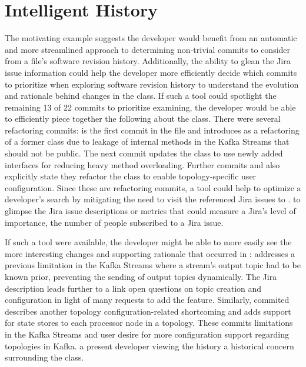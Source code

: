 
\section{Intelligent History}

The motivating example suggests the developer would benefit from an automatic 
and more streamlined approach to determining  non-trivial commits to consider from a file's software revision history.
Additionally, the ability to glean the Jira issue information could help the developer 
more efficiently decide which commits to prioritize when exploring software revision history to understand 
the evolution and rationale behind changes in the  class.
If such a tool could spotlight the remaining 13 of 22 commits to prioritize examining, 
the developer would be able to efficiently piece together the following  about the  class. 
There were several refactoring commits:  is the first commit in the file and introduces  as a refactoring of a former class due to leakage of internal methods in the Kafka Streams  that should not be public. 
The next commit  updates the  class to use newly added interfaces for reducing heavy method overloading.
Further commits  and  also explicitly state they refactor the  class to enable topology-specific user configuration.
Since these are refactoring commits, a tool could help to optimize a developer's search by mitigating the need to visit the referenced Jira issues to .
 to glimpse the Jira issue descriptions 
or metrics that could measure a Jira's level of importance, \eg the number of people subscribed to a Jira issue.

If such a tool were available, the developer might be able to more easily see the more interesting changes and supporting rationale that occurred in :
 addresses a previous limitation in the Kafka Streams  where a stream's output topic had to be known prior, preventing the sending of output topics dynamically. 
The Jira description leads further to a link  open questions on topic creation and configuration in light of many requests to add the feature.
Similarly,  commited  describes another topology configuration-related shortcoming and adds support for state stores to each processor node in a topology.
These commits  limitations in the Kafka Streams  and  user desire for more configuration support regarding topologies in Kafka. 
 a present developer viewing the history  a historical concern surrounding the  class.

